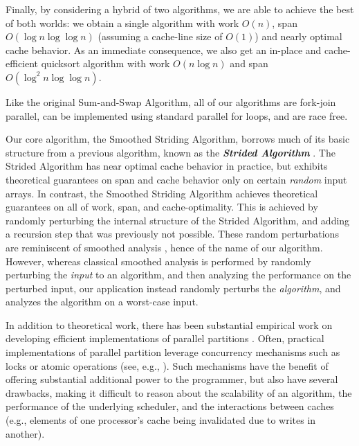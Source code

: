 \documentclass[11pt]{article}
\newcommand{\defn}[1]{{\textit{\textbf{\boldmath #1}}}}
\renewcommand{\paragraph}[1]{\vspace{0.09in}\noindent{\bf \boldmath #1.}}
\theoremstyle{remark}
\theoremstyle{remark}
\begin{document}
Finally, by considering a hybrid of two algorithms, we are able to
achieve the best of both worlds: we obtain a single algorithm with
work $O(n)$, span $O(\log n \log \log n)$ (assuming a cache-line size
of $O(1)$) and nearly optimal cache behavior. As an immediate
consequence, we also get an in-place and cache-efficient quicksort
algorithm with work $O(n \log n)$ and span $O(\log^2 n \log \log n)$.

Like the original Sum-and-Swap Algorithm, all of our algorithms are
fork-join parallel, can be implemented using standard parallel for
loops, and are race free.

\paragraph{Related Work}
Our core algorithm, the Smoothed Striding Algorithm, borrows much of
its basic structure from a previous algorithm, known as the
\defn{Strided Algorithm} \cite{FrancisPa92, Frias08}. The Strided
Algorithm has near optimal cache behavior in practice, but exhibits
theoretical guarantees on span and cache behavior only on certain
\emph{random} input arrays. In contrast, the Smoothed Striding
Algorithm achieves theoretical guarantees on all of work, span, and
cache-optimality. This is achieved by randomly perturbing the internal
structure of the Strided Algorithm, and adding a recursion step that
was previously not possible. These random perturbations are
reminiscent of smoothed analysis \cite{Smoothed1, Smoothed2,
  Smoothed3, Smoothed4, Smoothed5, Smoothed6}, hence of the name of our
algorithm. However, whereas classical smoothed analysis is performed
by randomly perturbing the \emph{input} to an algorithm, and then
analyzing the performance on the perturbed input, our application
instead randomly perturbs the \emph{algorithm}, and analyzes the
algorithm on a worst-case input.

In addition to theoretical work, there has been substantial empirical
work on developing efficient implementations of parallel partitions
\cite{HeidelbergerNo90, AxtmannWi17, TsigasZh03, FrancisPa92,
  Frias08}. Often, practical implementations of parallel partition
leverage concurrency mechanisms such as locks or atomic operations
(see, e.g., \cite{HeidelbergerNo90,AxtmannWi17,TsigasZh03}). Such
mechanisms have the benefit of offering substantial additional power
to the programmer, but also have several drawbacks, making it
difficult to reason about the scalability of an algorithm, the
performance of the underlying scheduler, and the interactions between
caches (e.g., elements of one processor's cache being invalidated due
to writes in another).
\end{document}
